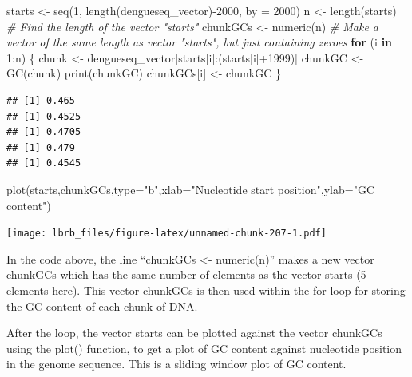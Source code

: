 \documentclass[
]{book}
\newenvironment{Shaded}{\begin{snugshade}}{\end{snugshade}}
\newcommand{\AttributeTok}[1]{\textcolor[rgb]{0.77,0.63,0.00}{#1}}
\newcommand{\CommentTok}[1]{\textcolor[rgb]{0.56,0.35,0.01}{\textit{#1}}}
\newcommand{\ControlFlowTok}[1]{\textcolor[rgb]{0.13,0.29,0.53}{\textbf{#1}}}
\newcommand{\DecValTok}[1]{\textcolor[rgb]{0.00,0.00,0.81}{#1}}
\newcommand{\FunctionTok}[1]{\textcolor[rgb]{0.00,0.00,0.00}{#1}}
\newcommand{\NormalTok}[1]{#1}
\newcommand{\OtherTok}[1]{\textcolor[rgb]{0.56,0.35,0.01}{#1}}
\newcommand{\SpecialCharTok}[1]{\textcolor[rgb]{0.00,0.00,0.00}{#1}}
\newcommand{\StringTok}[1]{\textcolor[rgb]{0.31,0.60,0.02}{#1}}
\begin{document}
\begin{Shaded}
\begin{Highlighting}[]
\NormalTok{ starts }\OtherTok{\textless{}{-}} \FunctionTok{seq}\NormalTok{(}\DecValTok{1}\NormalTok{, }\FunctionTok{length}\NormalTok{(dengueseq\_vector)}\SpecialCharTok{{-}}\DecValTok{2000}\NormalTok{, }\AttributeTok{by =} \DecValTok{2000}\NormalTok{)}
\NormalTok{ n }\OtherTok{\textless{}{-}} \FunctionTok{length}\NormalTok{(starts)    }\CommentTok{\# Find the length of the vector "starts"}
\NormalTok{ chunkGCs }\OtherTok{\textless{}{-}} \FunctionTok{numeric}\NormalTok{(n) }\CommentTok{\# Make a vector of the same length as vector "starts", but just containing zeroes}
 \ControlFlowTok{for}\NormalTok{ (i }\ControlFlowTok{in} \DecValTok{1}\SpecialCharTok{:}\NormalTok{n) \{}
\NormalTok{        chunk }\OtherTok{\textless{}{-}}\NormalTok{ dengueseq\_vector[starts[i]}\SpecialCharTok{:}\NormalTok{(starts[i]}\SpecialCharTok{+}\DecValTok{1999}\NormalTok{)]}
\NormalTok{        chunkGC }\OtherTok{\textless{}{-}} \FunctionTok{GC}\NormalTok{(chunk)}
        \FunctionTok{print}\NormalTok{(chunkGC)}
\NormalTok{        chunkGCs[i] }\OtherTok{\textless{}{-}}\NormalTok{ chunkGC}
\NormalTok{     \}}
\end{Highlighting}
\end{Shaded}

\begin{verbatim}
## [1] 0.465
## [1] 0.4525
## [1] 0.4705
## [1] 0.479
## [1] 0.4545
\end{verbatim}

\begin{Shaded}
\begin{Highlighting}[]
 \FunctionTok{plot}\NormalTok{(starts,chunkGCs,}\AttributeTok{type=}\StringTok{"b"}\NormalTok{,}\AttributeTok{xlab=}\StringTok{"Nucleotide start position"}\NormalTok{,}\AttributeTok{ylab=}\StringTok{"GC content"}\NormalTok{)}
\end{Highlighting}
\end{Shaded}

\texttt{[image: lbrb\_files/figure-latex/unnamed-chunk-207-1.pdf]}

In the code above, the line ``chunkGCs \textless- numeric(n)'' makes a new vector chunkGCs which has the same number of elements as the vector starts (5 elements here). This vector chunkGCs is then used within the for loop for storing the GC content of each chunk of DNA.

After the loop, the vector starts can be plotted against the vector chunkGCs using the plot() function, to get a plot of GC content against nucleotide position in the genome sequence. This is a sliding window plot of GC content.
\end{document}
